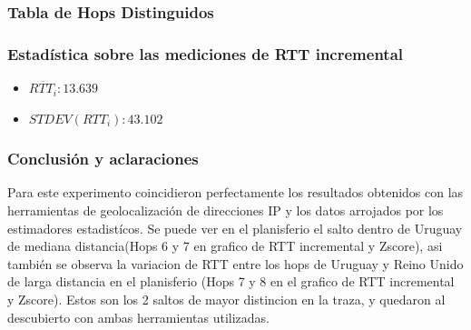 \subsubsection{Tabla de Hops Distinguidos}
\begin{center}
\end{center}

\subsubsection{Estadística sobre las mediciones de RTT incremental}
\begin{itemize}
	\item $\overline{RTT_i}: 13.639$
	\item $STDEV(RTT_i): 43.102$
\end{itemize}

\subsubsection{Conclusión y aclaraciones}
Para este experimento coincidieron perfectamente los resultados obtenidos con las herramientas de geolocalización de direcciones IP y los datos arrojados por los estimadores estadistícos. Se puede ver en el planisferio el salto dentro de Uruguay de mediana distancia(Hops 6 y 7 en grafico de RTT incremental y Zscore), asi también se observa la variacion de RTT entre los hops de Uruguay y Reino Unido de larga distancia en el planisferio (Hops 7 y 8 en el grafico de RTT incremental y Zscore). Estos son los 2 saltos de mayor distincion en la traza, y quedaron al descubierto con ambas herramientas utilizadas.
